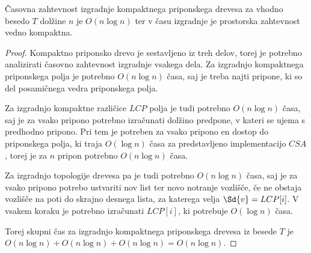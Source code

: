 \begin{izr} \label{izr:izgradnjaCST}
    Časovna zahtevnost izgradnje kompaktnega priponskega drevesa za vhodno besedo $T$ dolžine $n$ je $O(n\log{n})$ ter v času izgradnje je prostorska zahtevnost vedno kompaktna.
\end{izr}

\begin{proof}
    Kompaktno priponsko drevo je sestavljeno iz treh delov, torej je potrebno analizirati časovno zahtevnost izgradnje vsakega dela. Za izgradnjo kompaktnega priponskega polja je potrebno $O(n\log{n})$ časa, saj je treba najti pripone, ki so del posamičnega vedra priponskega polja.
    
    Za izgradnjo kompaktne različice $LCP$ polja je tudi potrebno $O(n\log{n})$ časa, saj je za vsako pripono potrebno izračunati dolžino predpone, v kateri se ujema s predhodno pripono. Pri tem je potreben za vsako pripono en dostop do priponskega polja, ki traja $O(\log{n})$ časa za predstavljeno implementacijo $CSA$, torej je za $n$ pripon potrebno $O(n\log{n})$ časa.

    Za izgradnjo topologije drevesa pa je tudi potrebno $O(n\log{n})$ časa, saj je za vsako pripono potrebo ustvariti nov list ter novo notranje vozlišče, če ne obstaja vozlišče na poti do skrajno desnega lista, za katerega velja $\Sd{v}=LCP[i]$. V vsakem koraku je potrebno izračunati $LCP[i]$, ki potrebuje $O(\log{n})$ časa.

    Torej skupni čas za izgradnjo kompaktnega priponskega drevesa iz besede $T$ je $O(n\log{n})+O(n\log{n})+O(n\log{n})=O(n\log{n})$.
\end{proof}

